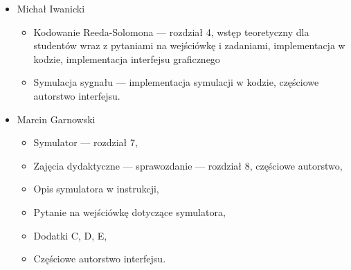 \begin{itemize}
    \item Michał Iwanicki
    \begin{itemize}
        \item Kodowanie Reeda-Solomona --- rozdział 4, wstęp teoretyczny dla studentów
        wraz z pytaniami na wejściówkę i zadaniami, implementacja w kodzie,
        implementacja interfejsu graficznego
        \item Symulacja sygnału --- implementacja symulacji w kodzie, częściowe
        autorstwo interfejsu.
    \end{itemize}
    \item Marcin Garnowski
    \begin{itemize}
        \item Symulator --- rozdział 7,
        \item Zajęcia dydaktyczne --- sprawozdanie --- rozdział 8, częściowe autorstwo,
        \item Opis symulatora w instrukcji,
        \item Pytanie na wejściówkę dotyczące symulatora,
        \item Dodatki C, D, E,
        \item Częściowe autorstwo interfejsu.
    \end{itemize}
\end{itemize}
